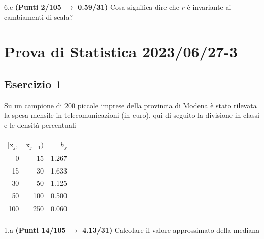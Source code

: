 \documentclass[
  11pt,
]{book}
\theoremstyle{mytheoremstyle}
\theoremstyle{mydefstyle}
\begin{document}
6.e \textbf{(Punti 2/105 \(\rightarrow\) 0.59/31)} Cosa significa dire che \(r\) è invariante ai cambiamenti di scala?

\section{Prova di Statistica 2023/06/27-3}\label{prova-di-statistica-20230627-3}

\subsection{Esercizio 1}\label{esercizio-1-31}

Su un campione di \(200\) piccole imprese della provincia di Modena è stato rilevata la spesa mensile in telecomunicazioni (in euro), qui di seguito
la divisione in classi e le densità percentuali

\begin{table}[H]
\centering
\begin{tabular}{rrr}
\toprule
$[\text{x}_j,$ & $\text{x}_{j+1})$ & $h_j$\\
\midrule
0 & 15 & 1.267\\
15 & 30 & 1.633\\
30 & 50 & 1.125\\
50 & 100 & 0.500\\
100 & 250 & 0.060\\
 &  & \\
\bottomrule
\end{tabular}
\end{table}

1.a \textbf{(Punti 14/105 \(\rightarrow\) 4.13/31)} Calcolare il valore approssimato della mediana
\end{document}
